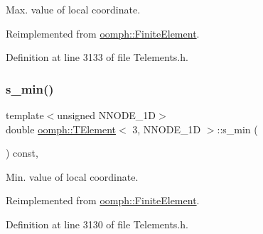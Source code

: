 Max. value of local coordinate. 



Reimplemented from \hyperlink{classoomph_1_1FiniteElement_a64adbe9356927133686ab53f00341ea8}{oomph\+::\+Finite\+Element}.



Definition at line 3133 of file Telements.\+h.

\mbox{\label{classoomph_1_1TElement_3_013_00_01NNODE__1D_01_4_abeff02fab19ae1db9aa9b127739ee16a}} 
\subsubsection{\texorpdfstring{s\+\_\+min()}{s\_min()}}
{\footnotesize\ttfamily template$<$unsigned N\+N\+O\+D\+E\+\_\+1D$>$ \\
double \hyperlink{classoomph_1_1TElement}{oomph\+::\+T\+Element}$<$ 3, N\+N\+O\+D\+E\+\_\+1D $>$\+::s\+\_\+min (\begin{DoxyParamCaption}{ }\end{DoxyParamCaption}) const\hspace{0.3cm}{\ttfamily [inline]}, {\ttfamily [virtual]}}



Min. value of local coordinate. 



Reimplemented from \hyperlink{classoomph_1_1FiniteElement_a35f0803115b68bd162c07de04eeb6c5c}{oomph\+::\+Finite\+Element}.



Definition at line 3130 of file Telements.\+h.

\mbox{\label{classoomph_1_1TElement_3_013_00_01NNODE__1D_01_4_a9b6f628400ab805a7131fd4b195b8beb}} 
